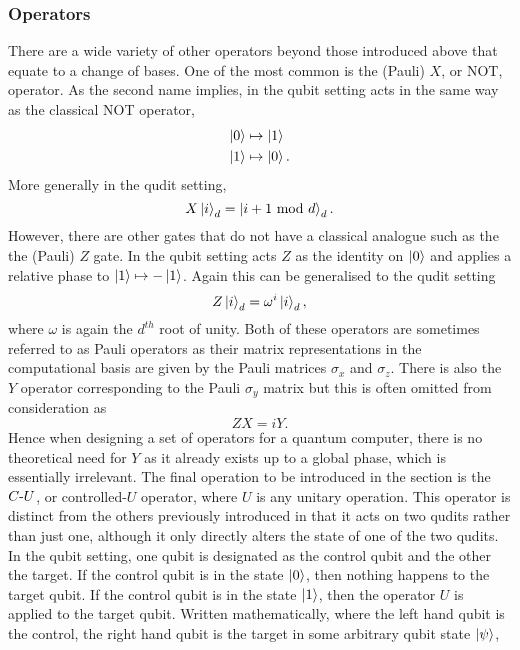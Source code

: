 \subsubsection{Operators}
\label{subsubsection:operators}
There are a wide variety of other operators beyond those introduced above that equate to a change of bases.
One of the most common is the (Pauli) $X$, or NOT, operator.
As the second name implies, in the qubit setting acts in the same way as the classical NOT operator,
\begin{align}
    \ket{0} &\mapsto \ket{1}\\
    \ket{1} &\mapsto \ket{0}.
\end{align}
More generally in the qudit setting,
\begin{equation}
    X\ket{i}_d = \ket{i + 1 \text{ mod } d}_d.
\end{equation}
However, there are other gates that do not have a classical analogue such as the  the (Pauli) $Z$ gate.
In the qubit setting acts $Z$ as the identity on $\ket{0}$ and applies a relative phase to $\ket{1} \mapsto -\ket{1}$.
Again this can be generalised to the qudit setting
\begin{equation}
    Z\ket{i}_d = \omega^i\ket{i}_d,
\end{equation}
where $\omega$ is again the $d^{th}$ root of unity.
Both of these operators are sometimes referred to as Pauli operators as their matrix representations in the computational basis are given by the Pauli matrices $\sigma_x$ and $\sigma_z$.
There is also the $Y$ operator corresponding to the Pauli $\sigma_y$ matrix but this is often omitted from consideration as
\begin{equation}
    ZX = iY.
\end{equation}
Hence when designing a set of operators for a quantum computer, there is no theoretical need for $Y$ as it already exists up to a global phase, which is essentially irrelevant.
The final operation to be introduced in the section is the $C\text{-}U$, or controlled-$U$ operator, where $U$ is any unitary operation.
This operator is distinct from the others previously introduced in that it acts on two qudits rather than just one, although it only directly alters the state of one of the two qudits.
In the qubit setting, one qubit is designated as the control qubit and the other the target.
If the control qubit is in the state $\ket{0}$, then nothing happens to the target qubit.
If the control qubit is in the state $\ket{1}$, then the operator $U$ is applied to the target qubit.
Written mathematically, where the left hand qubit is the control, the right hand qubit is the target in some arbitrary qubit state $\ket{\psi}$,
